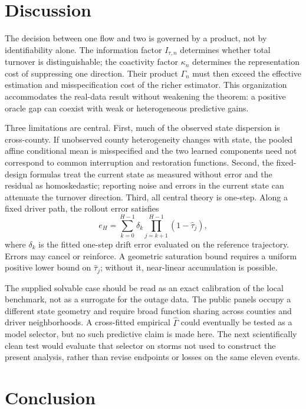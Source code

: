 \section{Discussion}

The decision between one flow and two is governed by a product, not by identifiability alone. The information factor $I_{\tau,n}$ determines whether total turnover is distinguishable; the coactivity factor $\kappa_n$ determines the representation cost of suppressing one direction. Their product $\Gamma_n$ must then exceed the effective estimation and misspecification cost of the richer estimator. This organization accommodates the real-data result without weakening the theorem: a positive oracle gap can coexist with weak or heterogeneous predictive gains.

Three limitations are central. First, much of the observed state dispersion is cross-county. If unobserved county heterogeneity changes with state, the pooled affine conditional mean is misspecified and the two learned components need not correspond to common interruption and restoration functions. Second, the fixed-design formulas treat the current state as measured without error and the residual as homoskedastic; reporting noise and errors in the current state can attenuate the turnover direction. Third, all central theory is one-step. Along a fixed driver path, the rollout error satisfies
\begin{equation}
e_H=\sum_{k=0}^{H-1}\delta_k
\prod_{j=k+1}^{H-1}(1-\widehat\tau_j),
\label{eq:rollout_bridge}
\end{equation}
where $\delta_k$ is the fitted one-step drift error evaluated on the reference trajectory. Errors may cancel or reinforce. A geometric saturation bound requires a uniform positive lower bound on $\widehat\tau_j$; without it, near-linear accumulation is possible.

The supplied solvable case should be read as an exact calibration of the local benchmark, not as a surrogate for the outage data. The public panels occupy a different state geometry and require broad function sharing across counties and driver neighborhoods. A cross-fitted empirical $\widehat\Gamma$ could eventually be tested as a model selector, but no such predictive claim is made here. The next scientifically clean test would evaluate that selector on storms not used to construct the present analysis, rather than revise endpoints or losses on the same eleven events.

\section{Conclusion}

